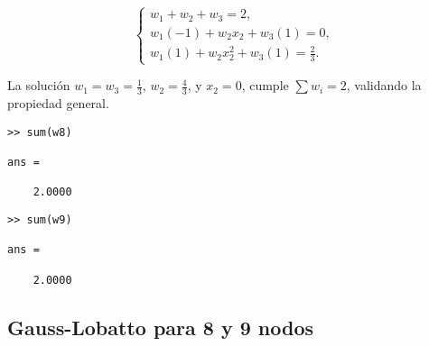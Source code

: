 \documentclass[a4paper]{article}
\begin{document}
\begin{itemize}
\[
\begin{cases}
w_1 + w_2 + w_3 = 2, \\
w_1(-1) + w_2 x_2 + w_3(1) = 0, \\
w_1(1) + w_2 x_2^2 + w_3(1) = \frac{2}{3}.
\end{cases}
\]

\noindent La solución \( w_1 = w_3 = \frac{1}{3} \), \( w_2 = \frac{4}{3} \), y \( x_2 = 0 \), cumple \( \sum w_i = 2 \), validando la propiedad general.

\begin{lstlisting}[frame=single, style=Matlab-Pyglike]
>> sum(w8)

ans =

    2.0000
\end{lstlisting}
\begin{lstlisting}[frame=single, style=Matlab-Pyglike]
>> sum(w9)

ans =

    2.0000
\end{lstlisting}
\end{itemize}

\subsection{Gauss-Lobatto para 8 y 9 nodos}
\end{document}
